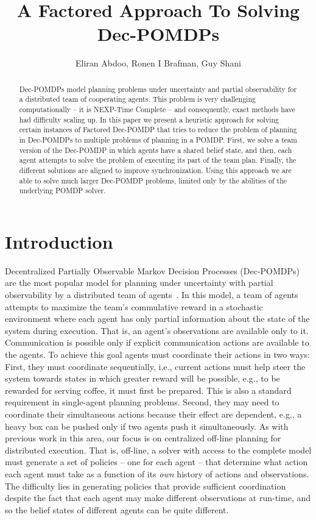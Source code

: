 \documentclass[letterpaper]{article} %
\title{A Factored Approach To Solving Dec-POMDPs }
\author{Eliran Abdoo, Ronen I Brafman, Guy Shani
}
\begin{document}
\maketitle

\begin{abstract}
Dec-POMDPs model planning problems under uncertainty and partial observability for a distributed team of cooperating agents. This problem is
very challenging computationally -- it is NEXP-Time Complete -- and consequently, exact methods have had difficulty scaling up. In this paper
we present a heuristic approach for solving certain instances of Factored Dec-POMDP that tries to reduce the problem of planning in Dec-POMDPs to multiple
problems of planning in a POMDP. First, we solve a team version of the Dec-POMDP in which agents have a shared belief state, and then, each agent attempts to solve the problem of executing its part of the team plan. Finally, the different solutions are aligned to improve synchronization. Using this approach we are able to solve much larger Dec-POMDP problems, limited only by the abilities of the underlying POMDP solver.
\end{abstract}

\section{Introduction}

Decentralized Partially Observable Markov Decision Processes (Dec-POMDPs) are the most popular model for planning under uncertainty with partial
observability by a distributed team of agents~\cite{}. In this model, a team of agents attempts to maximize the team's commulative reward in a stochastic
environment where each agent has only partial information about the state of the system during execution. That is, an agent's observations are available
only to it. Communication is possible only if explicit communication actions are available to the agents.  To achieve this goal agents must coordinate their
actions in two ways: First, they must coordinate sequentially, i.e., current actions must help steer the system towards states in which greater reward will be possible,
e.g., to be rewarded for serving coffee, it must first be prepared. This is also a standard requirement in single-agent planning problems. Second, they may need
to coordinate their simultaneous actions because their effect are dependent, e.g., a heavy box can be pushed only if two agents push it simultaneously. 
As with previous work in this area, our focus is on centralized off-line planning for distributed execution. That is, off-line, a solver with access to the
complete model must generate a set of policies -- one for each agent -- that determine what action each agent must take as a function of its {\em own} history of
actions and observations. The difficulty lies in generating policies that provide sufficient coordination despite the fact that each agent may make different
observations at run-time, and so the belief states of different agents can be quite different. 
\end{document}
